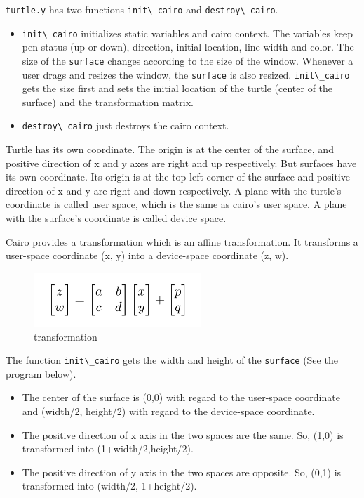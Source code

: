 \passthrough{\lstinline!turtle.y!} has two functions
\passthrough{\lstinline!init\_cairo!} and
\passthrough{\lstinline!destroy\_cairo!}.

\begin{itemize}
\tightlist
\item
  \passthrough{\lstinline!init\_cairo!} initializes static variables and
  cairo context. The variables keep pen status (up or down), direction,
  initial location, line width and color. The size of the
  \passthrough{\lstinline!surface!} changes according to the size of the
  window. Whenever a user drags and resizes the window, the
  \passthrough{\lstinline!surface!} is also resized.
  \passthrough{\lstinline!init\_cairo!} gets the size first and sets the
  initial location of the turtle (center of the surface) and the
  transformation matrix.
\item
  \passthrough{\lstinline!destroy\_cairo!} just destroys the cairo
  context.
\end{itemize}

Turtle has its own coordinate. The origin is at the center of the
surface, and positive direction of x and y axes are right and up
respectively. But surfaces have its own coordinate. Its origin is at the
top-left corner of the surface and positive direction of x and y are
right and down respectively. A plane with the turtle's coordinate is
called user space, which is the same as cairo's user space. A plane with
the surface's coordinate is called device space.

Cairo provides a transformation which is an affine transformation. It
transforms a user-space coordinate (x, y) into a device-space coordinate
(z, w).

\begin{figure}
\centering
\includegraphics[width=6.3cm,height=2.04cm]{../image/transformation.png}
\caption{transformation}
\end{figure}

The function \passthrough{\lstinline!init\_cairo!} gets the width and
height of the \passthrough{\lstinline!surface!} (See the program below).

\begin{itemize}
\tightlist
\item
  The center of the surface is (0,0) with regard to the user-space
  coordinate and (width/2, height/2) with regard to the device-space
  coordinate.
\item
  The positive direction of x axis in the two spaces are the same. So,
  (1,0) is transformed into (1+width/2,height/2).
\item
  The positive direction of y axis in the two spaces are opposite. So,
  (0,1) is transformed into (width/2,-1+height/2).
\end{itemize}

